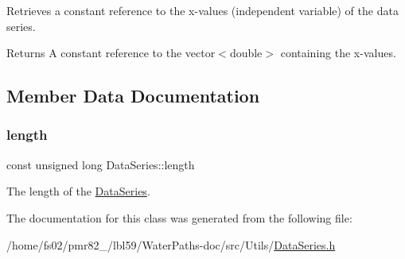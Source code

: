 Retrieves a constant reference to the x-\/values (independent variable) of the data series. 

\begin{DoxyReturn}{Returns}
A constant reference to the {\ttfamily vector$<$double$>$} containing the x-\/values. 
\end{DoxyReturn}


\subsection{Member Data Documentation}
\mbox{\label{classDataSeries_ad4a99b265519d2f57b787c03f2cf2f83}} 
\subsubsection{\texorpdfstring{length}{length}}
{\footnotesize\ttfamily const unsigned long Data\+Series\+::length}



The length of the \mbox{\hyperlink{classDataSeries}{Data\+Series}}. 



The documentation for this class was generated from the following file\+:\begin{DoxyCompactItemize}
\item 
/home/fs02/pmr82\+\_/lbl59/\+Water\+Paths-\/doc/src/\+Utils/\mbox{\hyperlink{DataSeries_8h}{Data\+Series.\+h}}\end{DoxyCompactItemize}

